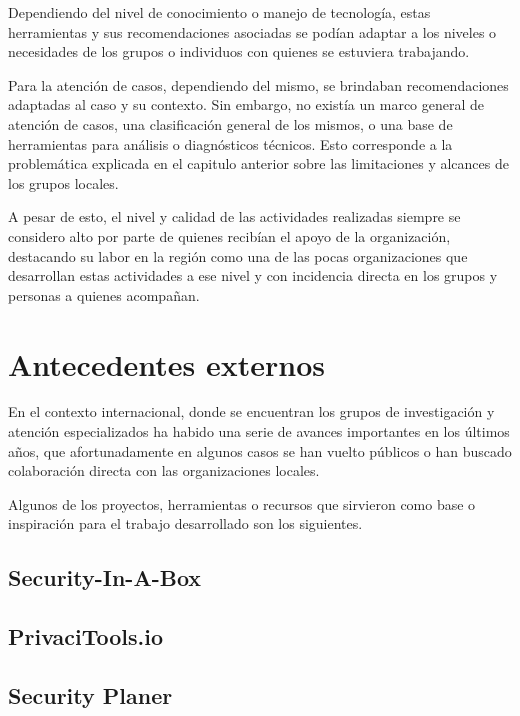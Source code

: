 \documentclass[12pt]{caltech_thesis}
\begin{document}
Dependiendo del nivel de conocimiento o manejo de tecnología, estas herramientas y sus recomendaciones asociadas se podían adaptar a los niveles o necesidades de los grupos o individuos con quienes se estuviera trabajando.

Para la atención de casos, dependiendo del mismo, se brindaban recomendaciones adaptadas al caso y su contexto. Sin embargo, no existía un marco general de atención de casos, una clasificación general de los mismos, o una base de herramientas para análisis o diagnósticos técnicos. Esto corresponde a la problemática explicada en el capitulo anterior sobre las limitaciones y alcances de los grupos locales.

A pesar de esto, el nivel y calidad de las actividades realizadas siempre se considero alto por parte de quienes recibían el apoyo de la organización, destacando su labor en la región como una de las pocas organizaciones que desarrollan estas actividades a ese nivel y con incidencia directa en los grupos y personas a quienes acompañan.

\section{Antecedentes externos}

En el contexto internacional, donde se encuentran los grupos de investigación y atención especializados ha habido una serie de avances importantes en los últimos años, que afortunadamente en algunos casos se han vuelto públicos o han buscado colaboración directa con las organizaciones locales.

Algunos de los proyectos, herramientas o recursos que sirvieron como base o inspiración para el trabajo desarrollado son los siguientes.

\subsection{Security-In-A-Box}

\lipsum[1]

\subsection{PrivaciTools.io}

\lipsum[1]

\subsection{Security Planer}
\end{document}
